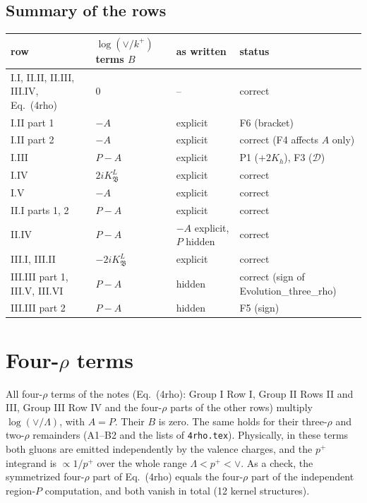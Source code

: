 \documentclass[10pt]{article}
\numberwithin{equation}{section}
\newcommand{\pp}{p^+}
\begin{document}
\subsection{Summary of the rows}
\begin{center}\small
\begin{tabular}{@{}l l l l@{}}
row & $\log(\vee/k^+)$ terms $B$ & as written & status\\ \hline
I.I, II.II, II.III, III.IV, Eq.~(4rho) & 0 & -- & correct\\
I.II part 1 & $-A$ & explicit & F6 (bracket)\\
I.II part 2 & $-A$ & explicit & correct (F4 affects $A$ only)\\
I.III & $P-A$ & explicit & P1 ($+2K_h$), F3 ($\mathcal D$)\\
I.IV & $2iK^L_{\mathfrak B}$ & explicit & correct\\
I.V & $-A$ & explicit & correct\\
II.I parts 1, 2 & $P-A$ & explicit & correct\\
II.IV & $P-A$ & $-A$ explicit, $P$ hidden & correct\\
III.I, III.II & $-2iK^L_{\mathfrak B}$ & explicit & correct\\
III.III part 1, III.V, III.VI & $P-A$ & hidden & correct (sign of Evolution\_three\_rho)\\
III.III part 2 & $P-A$ & hidden & F5 (sign)\\
\end{tabular}
\end{center}



\section{Four-\texorpdfstring{$\rho$}{rho} terms}\label{B:sec:four}
All four-$\rho$ terms of the notes (Eq.~(4rho): Group I Row I, Group II Rows II and III, Group III Row IV and the four-$\rho$ parts of the other rows) multiply $\log(\vee/\Lambda)$, with $A=P$. Their $B$ is zero. The same holds for their three-$\rho$ and two-$\rho$ remainders (A1--B2 and the lists of \texttt{4rho.tex}). Physically, in these terms both gluons are emitted independently by the valence charges, and the $\pp$ integrand is $\propto1/\pp$ over the whole range $\Lambda<\pp<\vee$. As a check, the symmetrized four-$\rho$ part of Eq.~(4rho) equals the four-$\rho$ part of the independent region-$P$ computation, and both vanish in total (12 kernel structures).
\end{document}
